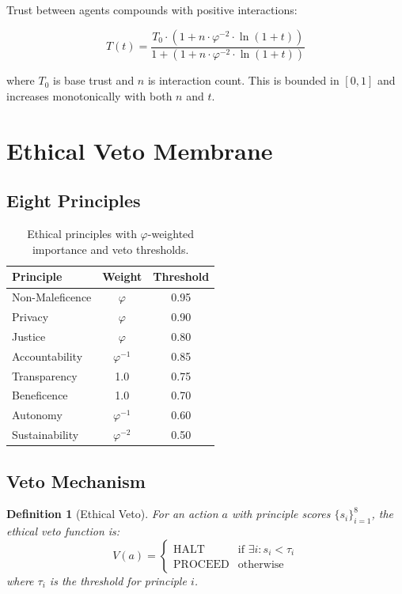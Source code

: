 \documentclass[11pt,twocolumn]{article}
\newtheorem{definition}[theorem]{Definition}
\begin{document}
Trust between agents compounds with positive interactions:

\begin{equation}
T(t) = \frac{T_0 \cdot (1 + n \cdot \varphi^{-2} \cdot \ln(1 + t))}{1 + (1 + n \cdot \varphi^{-2} \cdot \ln(1 + t))}
\end{equation}

where $T_0$ is base trust and $n$ is interaction count. This is bounded
in $[0, 1]$ and increases monotonically with both $n$ and $t$.

\section{Ethical Veto Membrane}

\subsection{Eight Principles}

\begin{table}[h]
\centering
\begin{tabular}{lcc}
\toprule
\textbf{Principle} & \textbf{Weight} & \textbf{Threshold} \\
\midrule
Non-Maleficence & $\varphi$ & 0.95 \\
Privacy & $\varphi$ & 0.90 \\
Justice & $\varphi$ & 0.80 \\
Accountability & $\varphi^{-1}$ & 0.85 \\
Transparency & 1.0 & 0.75 \\
Beneficence & 1.0 & 0.70 \\
Autonomy & $\varphi^{-1}$ & 0.60 \\
Sustainability & $\varphi^{-2}$ & 0.50 \\
\bottomrule
\end{tabular}
\caption{Ethical principles with $\varphi$-weighted importance and veto thresholds.}
\label{tab:principles}
\end{table}

\subsection{Veto Mechanism}

\begin{definition}[Ethical Veto]
For an action $a$ with principle scores $\{s_i\}_{i=1}^8$, the ethical
veto function is:
\begin{equation}
V(a) = \begin{cases}
\text{HALT} & \text{if } \exists i: s_i < \tau_i \\
\text{PROCEED} & \text{otherwise}
\end{cases}
\end{equation}
where $\tau_i$ is the threshold for principle $i$.
\end{definition}
\end{document}
